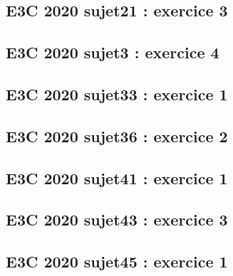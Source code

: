 \documentclass[lang=fr,edition=teacher,layout=sheet]{mxbook}
\begin{document}
\begingroup\endgroup
\par\bigskip
{}\subsection*{E3C 2020 sujet21 : exercice 3}
\begingroup\endgroup
\par\bigskip
{}\subsection*{E3C 2020 sujet3 : exercice 4}
\begingroup\endgroup
\par\bigskip
{}\subsection*{E3C 2020 sujet33 : exercice 1}
\begingroup\endgroup
\par\bigskip
{}\subsection*{E3C 2020 sujet36 : exercice 2}
\begingroup\endgroup
\par\bigskip
{}\subsection*{E3C 2020 sujet41 : exercice 1}
\begingroup\endgroup
\par\bigskip
{}\subsection*{E3C 2020 sujet43 : exercice 3}
\begingroup\endgroup
\par\bigskip
{}\subsection*{E3C 2020 sujet45 : exercice 1}
\end{document}
